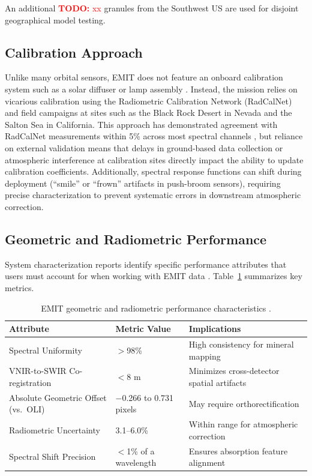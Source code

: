 \documentclass[11pt]{report}
\begin{document}
An additional \textcolor{red}{\textbf{TODO:} xx} granules from the Southwest US are used for disjoint geographical model testing.

\subsection{Calibration Approach}

Unlike many orbital sensors, EMIT does not feature an onboard calibration system such as a solar diffuser or lamp assembly \cite{thompson_emit_2024, emit_l1b_atbd}. Instead, the mission relies on vicarious calibration using the Radiometric Calibration Network (RadCalNet) and field campaigns at sites such as the Black Rock Desert in Nevada and the Salton Sea in California. This approach has demonstrated agreement with RadCalNet measurements within 5\% across most spectral channels \cite{thompson_emit_2024}, but reliance on external validation means that delays in ground-based data collection or atmospheric interference at calibration sites directly impact the ability to update calibration coefficients. Additionally, spectral response functions can shift during deployment (``smile'' or ``frown'' artifacts in push-broom sensors), requiring precise characterization to prevent systematic errors in downstream atmospheric correction.

\subsection{Geometric and Radiometric Performance}

System characterization reports identify specific performance attributes that users must account for when working with EMIT data \cite{usgs_emit_syschar}. Table~\ref{tab:emit_performance} summarizes key metrics.

\begin{table}[htbp]
\centering
\caption{EMIT geometric and radiometric performance characteristics \cite{usgs_emit_syschar,thompson_emit_2024,emit_l1b_atbd}.}
\label{tab:emit_performance}
\begin{tabular}{lll}
\hline
\textbf{Attribute} & \textbf{Metric Value} & \textbf{Implications} \\
\hline
Spectral Uniformity & $>$98\% & High consistency for mineral mapping \\
VNIR-to-SWIR Co-registration & $<$8 m & Minimizes cross-detector spatial artifacts \\
Absolute Geometric Offset (vs.\ OLI) & $-$0.266 to 0.731 pixels & May require orthorectification \\
Radiometric Uncertainty & 3.1--6.0\% & Within range for atmospheric correction \\
Spectral Shift Precision & $<$1\% of a wavelength & Ensures absorption feature alignment \\
\hline
\end{tabular}
\end{table}
\end{document}
